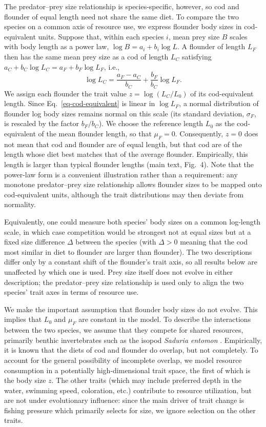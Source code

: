 \documentclass{article}
\begin{document}
The predator--prey size relationship is species-specific, however, so cod and flounder of equal length need not share the same diet. To compare the two species on a common axis of resource use, we express flounder body sizes in cod-equivalent units. Suppose that, within each species $i$, mean prey size $B$ scales with body length as a power law, $\log B = a_i + b_i \log L$. A flounder of length $L_F$ then has the same mean prey size as a cod of length $L_C$ satisfying $a_C + b_C \log L_C = a_F + b_F \log L_F$, i.e.,
\begin{equation}
  \label{eq-cod-equivalent}
  \log L_C = \frac{a_F - a_C}{b_C} + \frac{b_F}{b_C} \log L_F .
\end{equation}
We assign each flounder the trait value $z = \log(L_C/L_0)$ of its cod-equivalent length. Since Eq.~\ref{eq-cod-equivalent} is linear in $\log L_F$, a normal distribution of flounder log body sizes remains normal on this scale (its standard deviation, $\sigma_F$, is rescaled by the factor $b_F / b_C$). We choose the reference length $L_0$ as the cod-equivalent of the mean flounder length, so that $\mu_F = 0$. Consequently, $z = 0$ does not mean that cod and flounder are of equal length, but that cod are of the length whose diet best matches that of the average flounder. Empirically, this length is larger than typical flounder lengths (main text, Fig.~4). Note that the power-law form is a convenient illustration rather than a requirement: any monotone predator--prey size relationship allows flounder sizes to be mapped onto cod-equivalent units, although the trait distributions may then deviate from normality.

Equivalently, one could measure both species' body sizes on a common log-length scale, in which case competition would be strongest not at equal sizes but at a fixed size difference $\Delta$ between the species (with $\Delta > 0$ meaning that the cod most similar in diet to flounder are larger than flounder). The two descriptions differ only by a constant shift of the flounder's trait axis, so all results below are unaffected by which one is used. Prey size itself does not evolve in either description; the predator--prey size relationship is used only to align the two species' trait axes in terms of resource use.

We make the important assumption that flounder body sizes do not evolve. This implies that $L_0$ and $\mu_F$ are constant in the model. To describe the interactions between the two species, we assume that they compete for shared resources, primarily benthic invertebrates such as the isopod \textit{Saduria entomon} \citep{Haase2020}. Empirically, it is known that the diets of cod and flounder do overlap, but not completely. To account for the general possibility of incomplete overlap, we model resource consumption in a potentially high-dimensional trait space, the first of which is the body size $z$. The other traits (which may include preferred depth in the water, swimming speed, coloration, etc.) contribute to resource utilization, but are not under evolutionary influence: since the main driver of trait change is fishing pressure which primarily selects for size, we ignore selection on the other traits.
\end{document}
